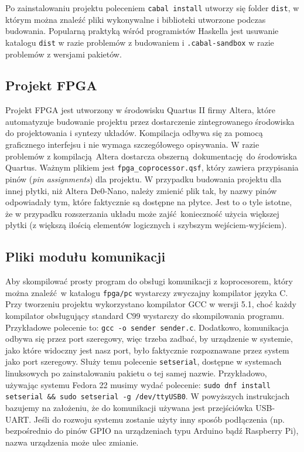 Po zainstalowaniu projektu poleceniem \texttt{cabal install} utworzy się folder \texttt{dist}, w którym można znaleźć pliki wykonywalne i biblioteki utworzone podczas budowania. Popularną praktyką wśród programistów Haskella jest usuwanie katalogu \texttt{dist} w razie problemów z budowaniem i \texttt{.cabal-sandbox} w razie problemów z wersjami pakietów.

\subsection{Projekt FPGA}

Projekt FPGA jest utworzony w środowisku Quartus II firmy Altera, które automatyzuje budowanie projektu przez dostarczenie zintegrowanego środowiska do projektowania i syntezy układów. Kompilacja odbywa się za pomocą graficznego interfejsu i nie wymaga szczegółowego opisywania. W razie problemów z kompilacją Altera dostarcza obszerną dokumentację do środowiska Quartus. Ważnym plikiem jest \texttt{fpga\_coprocessor.qsf}, który zawiera przypisania pinów (\textit{pin assignments}) dla projektu. W przypadku budowania projektu dla innej płytki, niż Altera De0-Nano, należy zmienić plik tak, by nazwy pinów odpowiadały tym, które faktycznie są dostępne na płytce. Jest to o tyle istotne, że w przypadku rozszerzania układu może zajść konieczność użycia większej płytki (z większą ilością elementów logicznych i szybszym wejściem-wyjściem).

\subsection{Pliki modułu komunikacji}

Aby skompilować prosty program do obsługi komunikacji z koprocesorem, który można znaleźć w katalogu \texttt{fpga/pc} wystarczy zwyczajny kompilator języka C. Przy tworzeniu projektu wykorzystano kompilator GCC w wersji 5.1, choć każdy kompilator obsługujący standard C99 wystarczy do skompilowania programu. Przykładowe polecenie to: \texttt{gcc -o sender sender.c}. Dodatkowo, komunikacja odbywa się przez port szeregowy, więc trzeba zadbać, by urządzenie w systemie, jako które widoczny jest nasz port, było faktycznie rozpoznawane przez system jako port szeregowy. Służy temu polecenie \texttt{setserial}, dostępne w systemach linuksowych po zainstalowaniu pakietu o tej samej nazwie. Przykładowo, używając systemu Fedora 22 musimy wydać polecenie: \texttt{sudo dnf install setserial \&\& sudo setserial -g /dev/ttyUSB0}. W powyższych instrukcjach bazujemy na założeniu, że do komunikacji używana jest przejściówka USB-UART. Jeśli do rozwoju systemu zostanie użyty inny sposób podłączenia (np. bezpośrednio do pinów GPIO na urządzeniach typu Arduino bądź Raspberry Pi), nazwa urządzenia może ulec zmianie.


